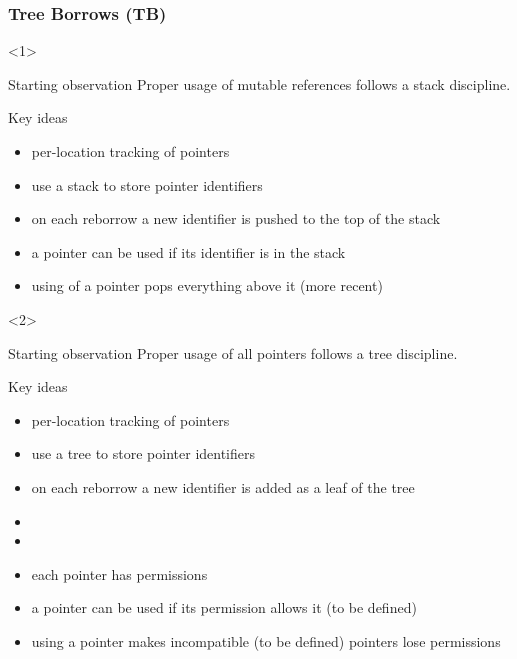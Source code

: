 \begin{frame}[t]
    \frametitle{ Tree Borrows (TB)}
    \begin{onlyenv}<1>
        \begin{block}{Starting observation}
            Proper usage of mutable references follows a stack discipline.
        \end{block}
        \begin{block}{Key ideas}
            \begin{itemize}
                \item per-location tracking of pointers
                \item use a stack to store pointer identifiers
                \item on each reborrow a new identifier is pushed to the top of the stack
                \item a pointer can be used if its identifier is in the stack
                \item using of a pointer pops everything above it (more recent)
            \end{itemize}
        \end{block}
    \end{onlyenv}

    \begin{onlyenv}<2>
        \begin{block}{Starting observation}
            Proper usage of {\color{red}all pointers} follows a {\color{red}tree} discipline.
        \end{block}
        \begin{block}{Key ideas}
            \begin{itemize}
                \item per-location tracking of pointers
                \item use a {\color{red}tree} to store pointer identifiers
                \item on each reborrow a new identifier is {\color{red}added as a leaf of the tree}
                \item {}
                \item {}
                \item each pointer has permissions
                \item a pointer can be used if its permission allows it (to be defined)
                \item using a pointer makes incompatible (to be defined) pointers lose permissions
            \end{itemize}
        \end{block}
    \end{onlyenv}
\end{frame}

